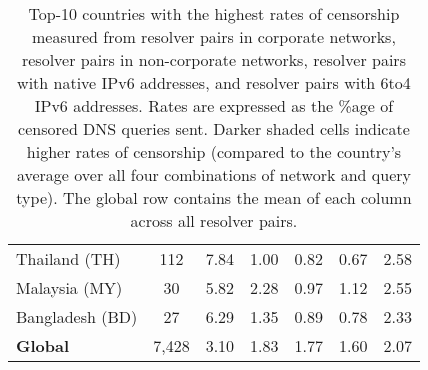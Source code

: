 \begin{table}[h!]
{\begin{tabular}{lcccccc}
Thailand (TH) & \color{black} 112 & {\cellcolor[HTML]{6AAED6}} \color[HTML]{F1F1F1} \color{black} 7.84 & {\cellcolor[HTML]{F3F8FE}} \color[HTML]{000000} \color{black} 1.00 & {\cellcolor[HTML]{F5FAFE}} \color[HTML]{000000} \color{black} 0.82 & {\cellcolor[HTML]{F7FBFF}} \color[HTML]{000000} \color{black} 0.67 & \color{black} 2.58 \\
Malaysia (MY) & \color{black} 30 & {\cellcolor[HTML]{6AAED6}} \color[HTML]{F1F1F1} \color{black} 5.82 & {\cellcolor[HTML]{DCEAF6}} \color[HTML]{000000} \color{black} 2.28 & {\cellcolor[HTML]{F7FBFF}} \color[HTML]{000000} \color{black} 0.97 & {\cellcolor[HTML]{F4F9FE}} \color[HTML]{000000} \color{black} 1.12 & \color{black} 2.55 \\
Bangladesh (BD) & \color{black} 27 & {\cellcolor[HTML]{6AAED6}} \color[HTML]{F1F1F1} \color{black} 6.29 & {\cellcolor[HTML]{EDF4FC}} \color[HTML]{000000} \color{black} 1.35 & {\cellcolor[HTML]{F5FAFE}} \color[HTML]{000000} \color{black} 0.89 & {\cellcolor[HTML]{F7FBFF}} \color[HTML]{000000} \color{black} 0.78 & \color{black} 2.33 \\
    
    \midrule
    {\bf Global} & \color{black} 7,428 & {\cellcolor[HTML]{6AAED6}}
    \color[HTML]{F1F1F1} \color{black} 3.10 & {\cellcolor[HTML]{DCE9F6}}
    \color[HTML]{000000} \color{black} 1.83 & {\cellcolor[HTML]{F7FBFF}}
    \color[HTML]{000000} \color{black} 1.77 & {\cellcolor[HTML]{F7FBFF}}
    \color[HTML]{000000} \color{black} 1.60 & \color{black} 2.07 \\

  \bottomrule
  \end{tabular}
  }
  \caption{Top-10 countries with the highest rates of censorship measured from
  resolver pairs in corporate networks, resolver pairs in non-corporate
  networks, resolver pairs with native IPv6 addresses, and resolver pairs with
  6to4 IPv6 addresses. Rates are expressed as the \%age of censored DNS queries
  sent. Darker shaded cells indicate higher rates of censorship (compared to
  the country's average over all four combinations of network and query type).
  The global row contains the mean of each column across all resolver pairs.}
  \label{tab:prevalence:rates:broken}
\end{table}

